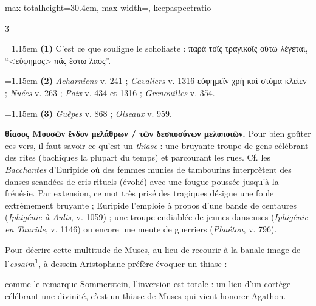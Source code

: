\documentclass[11pt,twoside]{book}
\newcommand{\italique}[1]{\textit{#1}}
\newcommand{\marqueur}[1]{\textsuperscript{\color{rubricRed}\textbf{#1}}}
\begin{document}
\begin{adjustbox}{max totalheight=30.4cm, max width=\textwidth, keepaspectratio}
\begin{minipage}{\textwidth}
{\begin{multicols}{3}
\par\vspace{1.5pt}
\par\vspace{1.2pt}\par\nopagebreak\vspace{1pt}\noindent\hangindent=1.15em {\color{sepiaNote}\textbf{(1)}} C'est ce que souligne le scholiaste : παρὰ τοῖς τραγικοῖς οὕτω λέγεται, ``<εὔφημος> πᾶς ἔστω λαός''.
\par\vspace{1.5pt}
\noindent\hangindent=1.15em {\color{sepiaNote}\textbf{(2)}} \italique{Acharniens} v. 241 ; \italique{Cavaliers} v. 1316 εὐφημεῖν χρὴ καὶ στόμα κλείεν ; \italique{Nuées} v. 263 ; \italique{Paix} v. 434 et 1316 ; \italique{Grenouilles} v. 354.
\par\vspace{1.5pt}
\noindent\hangindent=1.15em {\color{sepiaNote}\textbf{(3)}} \italique{Guêpes} v. 868 ; \italique{Oiseaux} v. 959.
\par\vspace{1.5pt}
 \textbf{θίασος Μουσῶν ἔνδον μελάθρων / τῶν δεσποσύνων μελοποιῶν.} Pour bien goûter ces vers, il faut savoir ce qu'est un \italique{thiase} : une bruyante troupe de gens célébrant des rites (bachiques la plupart du temps) et parcourant les rues. Cf. les \italique{Bacchantes} d'Euripide où des femmes munies de tambourins interprètent des danses scandées de cris rituels (évohé) avec une fougue poussée jusqu'à la frénésie. Par extension, ce mot très prisé des tragiques désigne une foule extrêmement bruyante ; Euripide l'emploie à propos d'une bande de centaures (\italique{Iphigénie à Aulis}, v. 1059) ; une troupe endiablée de jeunes danseuses (\italique{Iphigénie en Tauride}, v. 1146) ou encore une meute de guerriers (\italique{Phaéton}, v. 796).
\par\vspace{1.5pt}
\noindent Pour décrire cette multitude de Muses, au lieu de recourir à la banale image de l'\italique{essaim}\marqueur{1}, à dessein Aristophane préfère évoquer un thiase :
\par\vspace{1.5pt}
\noindent comme le remarque Sommerstein, l'inversion est totale : un lieu d'un cortège célébrant une divinité, c'est un thiase de Muses qui vient honorer Agathon.
\par\vspace{1.5pt}

\end{multicols}}
\end{minipage}
\end{adjustbox}
\end{document}
